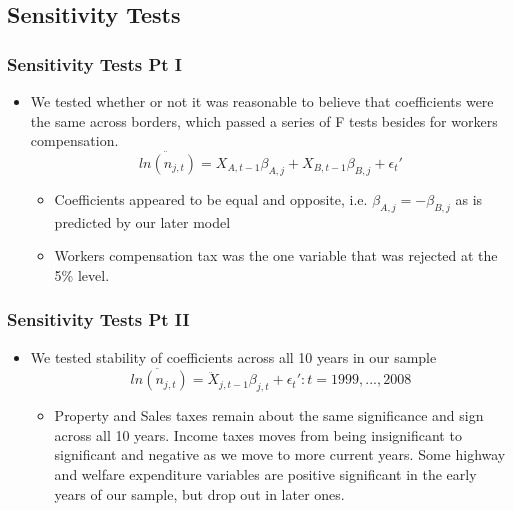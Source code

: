 \documentclass{beamer}
\begin{document}
\begin{frame}
\subsection{Sensitivity Tests}
\frametitle{Sensitivity Tests Pt I}
\begin{itemize}
\item We tested whether or not it was reasonable to believe that coefficients were the same across borders, which passed a series of F tests besides for workers compensation.
$$\ddot{ln(n_{j,t})} = X_{A,t-1}\beta_{A,j}+X_{B,t-1}\beta_{B,j} + \epsilon_{t}'$$ 
\begin{itemize}
\item Coefficients appeared to be equal and opposite, i.e. $\beta_{A,j} = - \beta_{B,j}$ as is predicted by our later model
\item Workers compensation tax was the one variable that was rejected at the 5\% level.
\end{itemize}
\end{itemize}
\end{frame}

\begin{frame}
\frametitle{Sensitivity Tests Pt II}
\begin{itemize}
\item We tested stability of coefficients across all 10 years in our sample
$$\ddot{ln(n_{j,t})} = \ddot X_{j,t-1}\beta_{j,t} + \epsilon_{t}': t = 1999,...,2008$$ 
\begin{itemize}
\item Property and Sales taxes remain about the same significance and sign across all 10 years. Income taxes moves from being insignificant to significant and negative as we move to more current years. Some highway and welfare expenditure variables are positive significant in the early years of our sample, but drop out in later ones. 
\end{itemize}
\end{itemize}
\end{frame}
\end{document}
